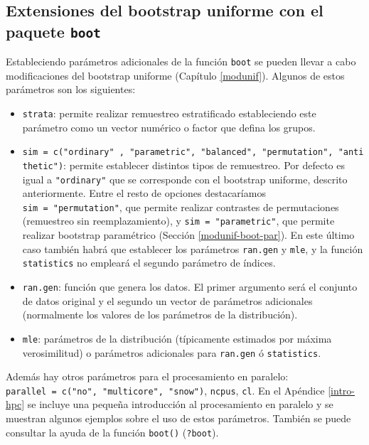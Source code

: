 \documentclass[
  spanish,
  10pt,
]{book}
\theoremstyle{break}
\theoremstyle{nonumberplain}
\begin{document}
\subsection{\texorpdfstring{Extensiones del bootstrap uniforme con el paquete \texttt{boot}}{Extensiones del bootstrap uniforme con el paquete boot}}\label{extensiones-del-bootstrap-uniforme-con-el-paquete-boot}

Estableciendo parámetros adicionales de la función \texttt{boot} se pueden llevar
a cabo modificaciones del bootstrap uniforme (Capítulo \ref{modunif}).
Algunos de estos parámetros son los siguientes:

\begin{itemize}
\item
  \texttt{strata}: permite realizar remuestreo estratificado estableciendo este parámetro
  como un vector numérico o factor que defina los grupos.
\item
  \texttt{sim\ =\ c("ordinary"\ ,\ "parametric",\ "balanced",\ "permutation",\ "antithetic")}:
  permite establecer distintos tipos de remuestreo.
  Por defecto es igual a \texttt{"ordinary"} que se corresponde con el bootstrap uniforme,
  descrito anteriormente. Entre el resto de opciones destacaríamos
  \texttt{sim\ =\ "permutation"}, que permite realizar contrastes de
  permutaciones (remuestreo sin reemplazamiento), y \texttt{sim\ =\ "parametric"},
  que permite realizar bootstrap paramétrico (Sección \ref{modunif-boot-par}).
  En este último caso también habrá que establecer los parámetros \texttt{ran.gen} y
  \texttt{mle}, y la función \texttt{statistics} no empleará el segundo parámetro de índices.
\item
  \texttt{ran.gen}: función que genera los datos. El primer argumento será el conjunto de datos
  original y el segundo un vector de parámetros adicionales
  (normalmente los valores de los parámetros de la distribución).
\item
  \texttt{mle}: parámetros de la distribución (típicamente estimados por máxima verosimilitud)
  o parámetros adicionales para \texttt{ran.gen} ó \texttt{statistics}.
\end{itemize}

Además hay otros parámetros para el procesamiento en paralelo: \texttt{parallel\ =\ c("no",\ "multicore",\ "snow")}, \texttt{ncpus}, \texttt{cl}.
En el Apéndice \ref{intro-hpc} se incluye una pequeña introducción al procesamiento en paralelo y se muestran algunos ejemplos sobre el uso de estos parámetros.
También se puede consultar la ayuda de la función \texttt{boot()} (\texttt{?boot}).
\end{document}

